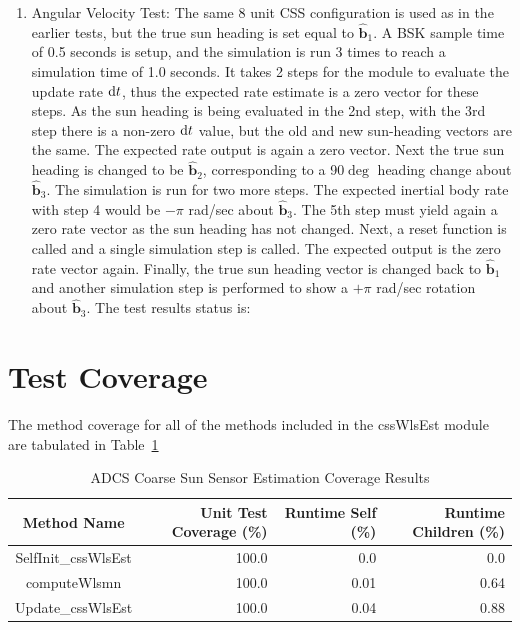 \documentclass[]{BasiliskReportMemo}
\begin{document}
\begin{enumerate}
   \item{Angular Velocity Test:  The same 8 unit CSS configuration is used as in the earlier tests, but the true sun heading is set equal to $\hat{\bm b}_{1}$.  A BSK sample time of 0.5 seconds is setup, and the simulation is run 3 times to reach a simulation time of 1.0 seconds.  It takes 2 steps for the module to evaluate the update rate $\textrm{d} t$, thus the expected rate estimate is a zero vector for these steps.  As the sun heading is being evaluated in the 2nd step, with the 3rd step there is a non-zero $\textrm{d} t$ value, but the old and new sun-heading vectors are the same.  The expected rate output is again a zero vector.  Next the true sun heading is changed to be $\hat{\bm b}_{2}$, corresponding to a 90$\deg$ heading change about $\hat{\bm b}_{3}$.  The simulation is run for two more steps. The expected inertial body rate with step 4 would be $-\pi$ rad/sec about $\hat{\bm b}_{3}$.  The 5th step must yield again a zero rate vector as the sun heading has not changed.  Next, a reset function is called and a single simulation step is called.  The expected output is the zero rate vector again.  Finally, the true sun heading vector is changed back to $\hat{\bm b}_{1}$ and another simulation step is performed to show a $+\pi$ rad/sec rotation about $\hat{\bm b}_{3}$.  
   The test results status is: }
\end{enumerate}

\section{Test Coverage}
The method coverage for all of the methods included in the cssWlsEst 
module are tabulated in Table~\ref{tab:cov_met}

\begin{table}[htbp]
    \caption{ADCS Coarse Sun Sensor Estimation Coverage Results}
   \label{tab:cov_met}
        \centering \fontsize{10}{10}\selectfont
   \begin{tabular}{c | r | r | r} %
      \hline
      Method Name    & Unit Test Coverage (\%) & Runtime Self (\%) & Runtime Children (\%) \\
      \hline
      SelfInit\_cssWlsEst& 100.0 & 0.0 & 0.0 \\
      computeWlsmn & 100.0 & 0.01 & 0.64 \\
      Update\_cssWlsEst & 100.0 & 0.04 & 0.88 \\
      \hline
   \end{tabular}
\end{table}
\end{document}
